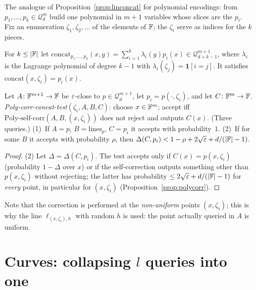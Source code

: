 The analogue of Proposition~\ref{prop:linconcat} for polynomial encodings: from $p_1,\dots,p_k\in\mathcal Q^m_d$ build one polynomial in $m+1$ variables whose slices are the $p_i$.  Fix an enumeration $\zeta_1,\zeta_2,\dots$ of the elements of $\mathbb{F}$; the $\zeta_i$ serve as indices for the $k$ pieces.

\begin{definition}\label{def:polyconcat}
For $k\le|\mathbb{F}|$ let $\mathrm{concat}_{p_1,\dots,p_k}(x,y)=\sum_{i=1}^k\lambda_i(y)p_i(x)\in\mathcal Q^{m+1}_{d+k-1}$, where $\lambda_i$ is the Lagrange polynomial of degree $k-1$ with $\lambda_i(\zeta_j)=\mathbf 1[i=j]$.  It satisfies $\mathrm{concat}(x,\zeta_i)=p_i(x)$.
\end{definition}

\begin{lemma}\label{lem:polyconcat}
Let $A\colon\mathbb{F}^{m+1}\to\mathbb{F}$ be $\varepsilon$-close to $p\in\mathcal Q^{m+1}_d$, let $p_i=p(\cdot,\zeta_i)$, and let $C\colon\mathbb{F}^m\to\mathbb{F}$.  \emph{Poly-corr-concat-test}$(\zeta_i,A,B,C)$: choose $x\in\mathbb{F}^m$; accept iff
$\mathrm{Poly\text{-}self\text{-}corr}(A,B,(x,\zeta_i))$ does not reject and outputs $C(x)$.  (Three queries.)  (1)~If $A=p$, $B=\mathrm{lines}_p$, $C=p_i$ it accepts with probability~$1$.  (2)~If for some $B$ it accepts with probability $\rho$, then $\Delta(C,p_i)<1-\rho+2\sqrt{\varepsilon}+d/(|\mathbb{F}|-1)$.
\end{lemma}
\begin{proof}
(2) Let $\Delta=\Delta(C,p_i)$.  The test accepts only if $C(x)=p(x,\zeta_i)$ (probability $1-\Delta$ over $x$) or if the self-correction outputs something other than $p(x,\zeta_i)$ without rejecting; the latter has probability $\le2\sqrt{\varepsilon}+d/(|\mathbb{F}|-1)$ for \emph{every} point, in particular for $(x,\zeta_i)$ (Proposition~\ref{prop:polycorr}).
\end{proof}

\noindent
Note that the correction is performed at the \emph{non-uniform} points $(x,\zeta_i)$; this is why the line $\ell_{(x,\zeta_i),h}$ with random $h$ is used: the point actually queried in $A$ is uniform.


\section{\texorpdfstring{Curves: collapsing $l$ queries into one}{Curves: collapsing l queries into one}}
\label{sec:curves}

